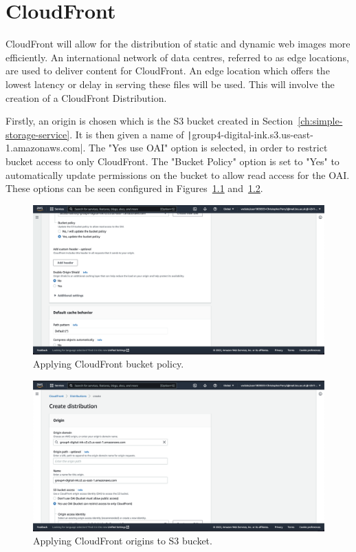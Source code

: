 \chapter{CloudFront}\label{ch:cloudfront}

CloudFront will allow for the distribution of static and dynamic web images more efficiently.
An international network of data centres, referred to as edge locations, are used to deliver content for CloudFront.
An edge location which offers the lowest latency or delay in serving these files will be used.
This will involve the creation of a CloudFront Distribution.

Firstly, an origin is chosen which is the S3 bucket created in Section~\ref{ch:simple-storage-service}.
It is then given a name of \texttt|group4-digital-ink.s3.us-east-1.amazonaws.com|.
The "Yes use OAI" option is selected, in order to restrict bucket access to only CloudFront.
The "Bucket Policy" option is set to "Yes" to automatically update permissions on the bucket to allow read access for
the OAI.
These options can be seen configured in Figures~\ref{fig:cloudfront-bucket-policy} and~\ref{fig:cloudfront-origins}.

\clearpage

\begin{figure}[!htbp]
    \centering
    \includegraphics[width=\textwidth]{resources/cloudfront/cloudfront-bucket-policy}
    \caption{Applying CloudFront bucket policy.}
    \label{fig:cloudfront-bucket-policy}
\end{figure}

\begin{figure}[!htbp]
    \centering
    \includegraphics[width=\textwidth]{resources/cloudfront/cloudfront-origin}
    \caption{Applying CloudFront origins to S3 bucket.}
    \label{fig:cloudfront-origins}
\end{figure}

